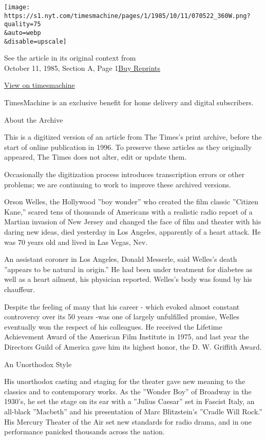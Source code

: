 \texttt{[image: https://s1.nyt.com/timesmachine/pages/1/1985/10/11/070522\_360W.png?quality=75\\\&auto=webp\\\&disable=upscale]}

See the article in its original context from\\
October 11, 1985, Section A, Page
1\href{https://store.nytimes.com/collections/new-york-times-page-reprints?utm_source=nytimes\&utm_medium=article-page\&utm_campaign=reprints}{Buy
Reprints}

\href{http://timesmachine.nytimes.com/timesmachine/1985/10/11/070522.html}{View
on timesmachine}

TimesMachine is an exclusive benefit for home delivery and digital
subscribers.

About the Archive

This is a digitized version of an article from The Times's print
archive, before the start of online publication in 1996. To preserve
these articles as they originally appeared, The Times does not alter,
edit or update them.

Occasionally the digitization process introduces transcription errors or
other problems; we are continuing to work to improve these archived
versions.

Orson Welles, the Hollywood ''boy wonder'' who created the film classic
''Citizen Kane,'' scared tens of thousands of Americans with a realistic
radio report of a Martian invasion of New Jersey and changed the face of
film and theater with his daring new ideas, died yesterday in Los
Angeles, apparently of a heart attack. He was 70 years old and lived in
Las Vegas, Nev.

An assistant coroner in Los Angeles, Donald Messerle, said Welles's
death ''appears to be natural in origin.'' He had been under treatment
for diabetes as well as a heart ailment, his physician reported.
Welles's body was found by his chauffeur.

Despite the feeling of many that his career - which evoked almost
constant controversy over its 50 years -was one of largely unfulfilled
promise, Welles eventually won the respect of his colleagues. He
received the Lifetime Achievement Award of the American Film Institute
in 1975, and last year the Directors Guild of America gave him its
highest honor, the D. W. Griffith Award.

An Unorthodox Style

His unorthodox casting and staging for the theater gave new meaning to
the classics and to contemporary works. As the ''Wonder Boy'' of
Broadway in the 1930's, he set the stage on its ear with a ''Julius
Caesar'' set in Fascist Italy, an all-black ''Macbeth'' and his
presentation of Marc Blitzstein's ''Cradle Will Rock.'' His Mercury
Theater of the Air set new standards for radio drama, and in one
performance panicked thousands across the nation.

